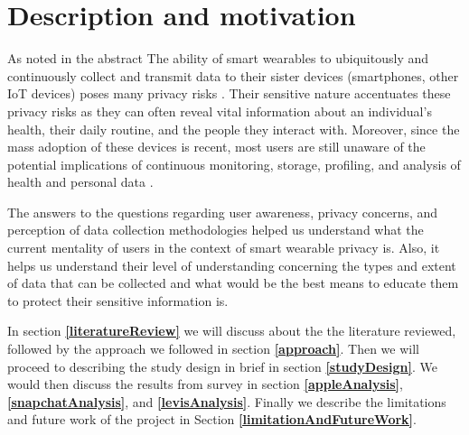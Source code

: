 \documentclass[sigconf]{acmart}
\begin{document}




\maketitle

\section{Description and motivation} \label{motivation}
As noted in the abstract The ability of smart wearables to ubiquitously and continuously collect and transmit data to their sister devices (smartphones, other IoT devices) poses many privacy risks \cite{Paul:2014:PIW:2659651.2659683}. Their sensitive nature accentuates these privacy risks as they can often reveal vital information about an individual’s health, their daily routine, and the people they interact with. Moreover, since the mass adoption of these devices is recent, most users are still unaware of the potential implications of continuous monitoring, storage, profiling, and analysis of health and personal data \cite{10.1007/978-3-662-48051-9_17}. 

The answers to the questions regarding user awareness, privacy concerns, and perception of data collection methodologies helped us understand what the current mentality of users in the context of smart wearable privacy is. Also, it helps us understand their level of understanding concerning the types and extent of data that can be collected and what would be the best means to educate them to protect their sensitive information is.

In section \textbf{\ref{literatureReview}} we will discuss about the the literature reviewed, followed by the approach we followed in section \textbf{\ref{approach}}. Then we will proceed to describing the study design in brief in section \textbf{\ref{studyDesign}}. We would then discuss the results from survey in section \textbf{\ref{appleAnalysis}}, \textbf{\ref{snapchatAnalysis}}, and \textbf{\ref{levisAnalysis}}. Finally we describe the limitations and future work of the project in Section \textbf{\ref{limitationAndFutureWork}}.
\end{document}
